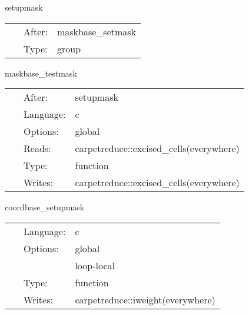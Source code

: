 \vspace{5mm}


\hspace{5mm} setupmask 

\hspace{5mm}{\it set up the real weight function (schedule other routines in here) } 


\hspace{5mm}

 \begin{tabular*}{160mm}{cll} 
~ & After:  & maskbase\_setmask \\ 
~ & Type:  & group \\ 
\end{tabular*} 


\vspace{5mm}


\hspace{5mm} maskbase\_testmask 

\hspace{5mm}{\it test the weight function } 


\hspace{5mm}

 \begin{tabular*}{160mm}{cll} 
~ & After:  & setupmask \\ 
~ & Language:  & c \\ 
~ & Options:  & global \\ 
~ & Reads:  & carpetreduce::excised\_cells(everywhere) \\ 
~ & Type:  & function \\ 
~ & Writes:  & carpetreduce::excised\_cells(everywhere) \\ 
\end{tabular*} 


\vspace{5mm}


\hspace{5mm} coordbase\_setupmask 

\hspace{5mm}{\it set up the outer boundaries of the weight function } 


\hspace{5mm}

 \begin{tabular*}{160mm}{cll} 
~ & Language:  & c \\ 
~ & Options:  & global \\ 
~& ~ &loop-local\\ 
~ & Type:  & function \\ 
~ & Writes:  & carpetreduce::iweight(everywhere) \\ 
\end{tabular*} 


